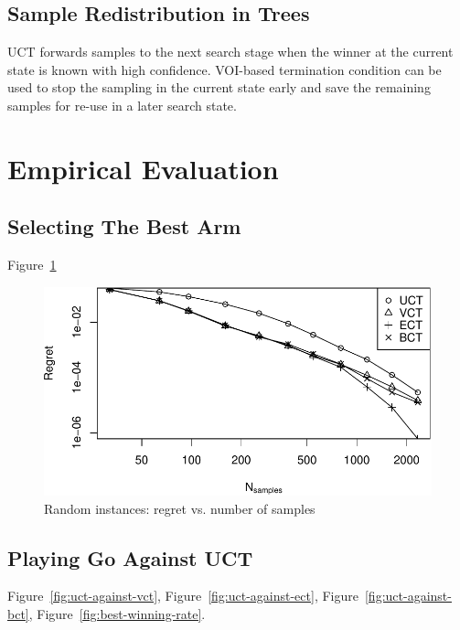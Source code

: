 \documentclass{article}
\begin{document}
\subsection{Sample Redistribution in Trees}

UCT forwards samples to the next search stage when the winner at the
current state is known with high confidence. VOI-based termination
condition can be used to stop the sampling in the current state early
and save the remaining samples for re-use in a later search state.

\section{Empirical Evaluation}
\label{sec:empirical-evaluation}

\subsection{Selecting The Best Arm}

Figure~\ref{fig:random-instances}

\begin{figure}[h]
\centering
\includegraphics[scale=0.8]{flat.pdf}
\caption{Random instances: regret vs. number of samples}
\label{fig:random-instances}
\end{figure}


\subsection{Playing Go Against UCT}

Figure~\ref{fig:uct-against-vct}, Figure~\ref{fig:uct-against-ect},
Figure~\ref{fig:uct-against-bct}, Figure~\ref{fig:best-winning-rate}.
\end{document}

